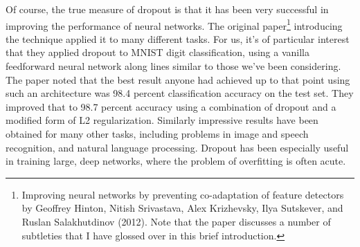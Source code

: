 \documentclass[a4paper,twoside,10pt]{book}
\begin{document}
Of course, the true measure of dropout is that it has been very successful in improving the performance of neural networks. The original paper\footnote{Improving neural networks by preventing co-adaptation of feature detectors by Geoffrey Hinton, Nitish Srivastava, Alex Krizhevsky, Ilya Sutskever, and Ruslan Salakhutdinov (2012). Note that the paper discusses a number of subtleties that I have glossed over in this brief introduction.} introducing the technique applied it to many different tasks. For us, it's of particular interest that they applied dropout to MNIST digit classification, using a vanilla feedforward neural network along lines similar to those we've been considering. The paper noted that the best result anyone had achieved up to that point using such an architecture was 98.4 percent classification accuracy on the test set. They improved that to 98.7 percent accuracy using a combination of dropout and a modified form of L2 regularization. Similarly impressive results have been obtained for many other tasks, including problems in image and speech recognition, and natural language processing. Dropout has been especially useful in training large, deep networks, where the problem of overfitting is often acute.
\end{document}
